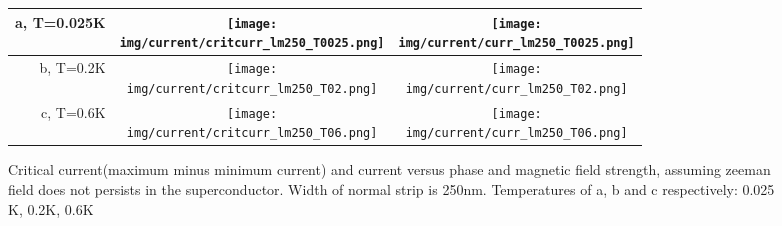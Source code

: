 \documentclass[10pt,a4paper]{article}
\newcommand{\img}{./images}
\begin{document}
		\begin{figure}[H]
			\begin{tabular}{rcc}
				a, T=0.025K&\texttt{[image: \\img/current/critcurr\_lm250\_T0025.png]}&
				\texttt{[image: \\img/current/curr\_lm250\_T0025.png]}\\
				\hline
				b, T=0.2K&\texttt{[image: \\img/current/critcurr\_lm250\_T02.png]}&
				\texttt{[image: \\img/current/curr\_lm250\_T02.png]}\\
				\hline
				c, T=0.6K&\texttt{[image: \\img/current/critcurr\_lm250\_T06.png]}&
				\texttt{[image: \\img/current/curr\_lm250\_T06.png]}\\
				\hline
			\end{tabular}
			\caption{Critical current(maximum minus minimum current) and current versus phase and magnetic field strength, assuming zeeman field does not persists in the superconductor. Width of normal strip is 250nm. Temperatures of a, b and c respectively: 0.025 K, 0.2K, 0.6K}
		\end{figure}
\clearpage
\printglossaries
\end{document}

